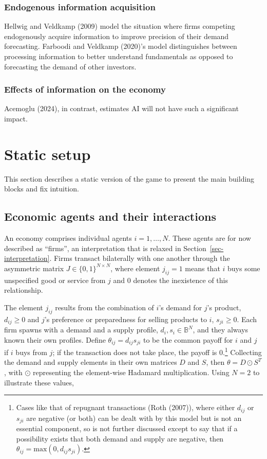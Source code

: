 \documentclass[
]{article}
\theoremstyle{plain}
\theoremstyle{definition}
\theoremstyle{remark}
\begin{document}
\subsubsection{Endogenous information
acquisition}\label{endogenous-information-acquisition}

Hellwig and Veldkamp (2009) model the situation where firms competing
endogenously acquire information to improve precision of their demand
forecasting. Farboodi and Veldkamp (2020)'s model distinguishes between
processing information to better understand fundamentals as opposed to
forecasting the demand of other investors.

\subsubsection{Effects of information on the
economy}\label{effects-of-information-on-the-economy}

Acemoglu (2024), in contrast, estimates AI will not have such a
significant impact.

\section{Static setup}\label{static-setup}

This section describes a static version of the game to present the main
building blocks and fix intuition.

\subsection{Economic agents and their
interactions}\label{economic-agents-and-their-interactions}

An economy comprises individual agents \(i = 1, \dots, N\). These agents
are for now described as ``firms'', an interpretation that is relaxed in
Section~\ref{sec-interpretation}. Firms transact bilaterally with one
another through the asymmetric matrix \(J \in \{0, 1\}^{N \times N}\),
where element \(j_{ij} = 1\) means that \(i\) buys some unspecified good
or service from \(j\) and \(0\) denotes the inexistence of this
relationship.

The element \(j_{ij}\) results from the combination of \(i\)'s demand
for \(j\)'s product, \(d_{ij} \geq 0\) and \(j\)'s preference or
preparedness for selling products to \(i\), \(s_{ji} \geq 0\). Each firm
spawns with a demand and a supply profile,
\(d_i, s_i \in \mathbb{B}^N\), and they always known their own profiles.
Define \(\theta_{ij} = d_{ij} s_{ji}\) to be the common payoff for \(i\)
and \(j\) if \(i\) buys from \(j\); if the transaction does not take
place, the payoff is \(0\).\footnote{Cases like that of repugnant
  transactions (Roth (2007)), where either \(d_{ij}\) or \(s_{ji}\) are
  negative (or both) can be dealt with by this model but is not an
  essential component, so is not further discussed except to say that if
  a possibility exists that both demand and supply are negative, then
  \(\theta_{ij} = \text{max}(0, d_{ij} s_{ji})\).} Collecting the demand
and supply elements in their own matrices \(D\) and \(S\), then
\(\theta = D \odot S^T\), with \(\odot\) representing the element-wise
Hadamard multiplication. Using \(N=2\) to illustrate these values,
\end{document}
